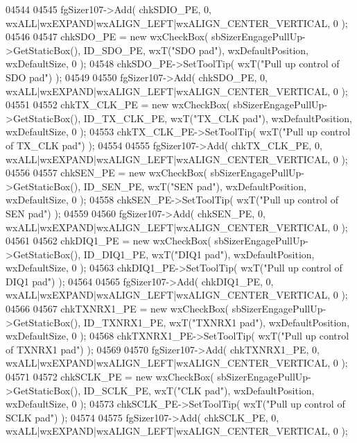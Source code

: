 \begin{DoxyCode}
04544     
04545     fgSizer107->Add( chkSDIO_PE, 0, wxALL|wxEXPAND|wxALIGN\_LEFT|wxALIGN\_CENTER\_VERTICAL, 0 );
04546     
04547     chkSDO_PE = \textcolor{keyword}{new} wxCheckBox( sbSizerEngagePullUp->GetStaticBox(), ID_SDO_PE, wxT(\textcolor{stringliteral}{"SDO pad"}), 
      wxDefaultPosition, wxDefaultSize, 0 );
04548     chkSDO_PE->SetToolTip( wxT(\textcolor{stringliteral}{"Pull up control of SDO pad"}) );
04549     
04550     fgSizer107->Add( chkSDO_PE, 0, wxALL|wxEXPAND|wxALIGN\_LEFT|wxALIGN\_CENTER\_VERTICAL, 0 );
04551     
04552     chkTX_CLK_PE = \textcolor{keyword}{new} wxCheckBox( sbSizerEngagePullUp->GetStaticBox(), 
      ID_TX_CLK_PE, wxT(\textcolor{stringliteral}{"TX\_CLK pad"}), wxDefaultPosition, wxDefaultSize, 0 );
04553     chkTX_CLK_PE->SetToolTip( wxT(\textcolor{stringliteral}{"Pull up control of TX\_CLK pad"}) );
04554     
04555     fgSizer107->Add( chkTX_CLK_PE, 0, wxALL|wxEXPAND|wxALIGN\_LEFT|wxALIGN\_CENTER\_VERTICAL, 0 );
04556     
04557     chkSEN_PE = \textcolor{keyword}{new} wxCheckBox( sbSizerEngagePullUp->GetStaticBox(), ID_SEN_PE, wxT(\textcolor{stringliteral}{"SEN pad"}), 
      wxDefaultPosition, wxDefaultSize, 0 );
04558     chkSEN_PE->SetToolTip( wxT(\textcolor{stringliteral}{"Pull up control of SEN pad"}) );
04559     
04560     fgSizer107->Add( chkSEN_PE, 0, wxALL|wxEXPAND|wxALIGN\_LEFT|wxALIGN\_CENTER\_VERTICAL, 0 );
04561     
04562     chkDIQ1_PE = \textcolor{keyword}{new} wxCheckBox( sbSizerEngagePullUp->GetStaticBox(), ID_DIQ1_PE, wxT(\textcolor{stringliteral}{"DIQ1 pad"}), 
      wxDefaultPosition, wxDefaultSize, 0 );
04563     chkDIQ1_PE->SetToolTip( wxT(\textcolor{stringliteral}{"Pull up control of DIQ1 pad"}) );
04564     
04565     fgSizer107->Add( chkDIQ1_PE, 0, wxALL|wxEXPAND|wxALIGN\_LEFT|wxALIGN\_CENTER\_VERTICAL, 0 );
04566     
04567     chkTXNRX1_PE = \textcolor{keyword}{new} wxCheckBox( sbSizerEngagePullUp->GetStaticBox(), 
      ID_TXNRX1_PE, wxT(\textcolor{stringliteral}{"TXNRX1 pad"}), wxDefaultPosition, wxDefaultSize, 0 );
04568     chkTXNRX1_PE->SetToolTip( wxT(\textcolor{stringliteral}{"Pull up control of TXNRX1 pad"}) );
04569     
04570     fgSizer107->Add( chkTXNRX1_PE, 0, wxALL|wxEXPAND|wxALIGN\_LEFT|wxALIGN\_CENTER\_VERTICAL, 0 );
04571     
04572     chkSCLK_PE = \textcolor{keyword}{new} wxCheckBox( sbSizerEngagePullUp->GetStaticBox(), ID_SCLK_PE, wxT(\textcolor{stringliteral}{"CLK pad"}), 
      wxDefaultPosition, wxDefaultSize, 0 );
04573     chkSCLK_PE->SetToolTip( wxT(\textcolor{stringliteral}{"Pull up control of SCLK pad"}) );
04574     
04575     fgSizer107->Add( chkSCLK_PE, 0, wxALL|wxEXPAND|wxALIGN\_LEFT|wxALIGN\_CENTER\_VERTICAL, 0 );

\end{DoxyCode}
